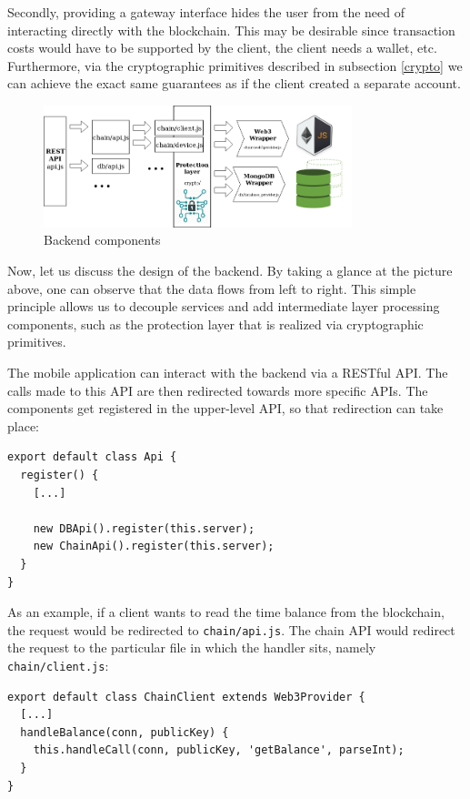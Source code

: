 \documentclass[12pt]{report}
\begin{document}
Secondly, providing a gateway interface hides the user from the need of interacting directly with the blockchain. This may be desirable since transaction costs would have to be supported by the client, the client needs a wallet, etc. Furthermore, via the cryptographic primitives described in subsection \ref{crypto} we can achieve the exact same guarantees as if the client created a separate account.

\begin{figure}[h]
	\centering
	\includegraphics[width=0.8\textwidth]{backend.png}
	\caption{Backend components}
	\label{label:file_name}
\end{figure}

Now, let us discuss the design of the backend. By taking a glance at the picture above, one can observe that the data flows from left to right. This simple principle allows us to decouple services and add intermediate layer processing components, such as the protection layer that is realized via cryptographic primitives.

The mobile application can interact with the backend via a RESTful API. The calls made to this API are then redirected towards more specific APIs. The components get registered in the upper-level API, so that redirection can take place:
\begin{lstlisting}
export default class Api {
  register() {
    [...]

    new DBApi().register(this.server);
    new ChainApi().register(this.server);
  }
}
\end{lstlisting}

As an example, if a client wants to read the time balance from the blockchain, the request would be redirected to \texttt{chain/api.js}. The chain API would redirect the request to the particular file in which the handler sits, namely \texttt{chain/client.js}:

\begin{lstlisting}
export default class ChainClient extends Web3Provider {
  [...]
  handleBalance(conn, publicKey) {
    this.handleCall(conn, publicKey, 'getBalance', parseInt);
  }
}
\end{lstlisting}
\end{document}

